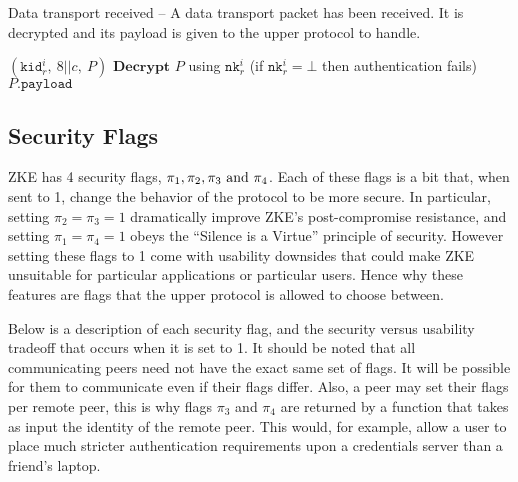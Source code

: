 \documentclass{article}
\begin{document}
\begin{algorithm}
	\caption{Data transport received -- A data transport packet has been received. It is decrypted and its payload is given to the upper protocol to handle.}
	\begin{algorithmic}
		\Require $(\texttt{kid}^i_r,\ 8||c,\ P)$
		\State $\textbf{Decrypt } P$ using $\texttt{nk}^i_r$ (if $\texttt{nk}^i_r=\bot$ then authentication fails)
		\Ensure $P\texttt{.payload}$
	\end{algorithmic}
\end{algorithm}

\subsection{Security Flags}\label{sec:security_flags}

ZKE has 4 security flags, $\pi_1, \pi_2, \pi_3 \text{ and } \pi_4$. Each of these flags is a bit that, when sent to 1, change the behavior of the protocol to be more secure. In particular, setting $\pi_2 = \pi_3 = 1$ dramatically improve ZKE's post-compromise resistance, and setting $\pi_1 = \pi_4 = 1$ obeys the ``Silence is a Virtue'' principle of security. However setting these flags to 1 come with usability downsides that could make ZKE unsuitable for particular applications or particular users. Hence why these features are flags that the upper protocol is allowed to choose between.

Below is a description of each security flag, and the security versus usability tradeoff that occurs when it is set to 1. It should be noted that all communicating peers need not have the exact same set of flags. It will be possible for them to communicate even if their flags differ. Also, a peer may set their flags per remote peer, this is why flags $\pi_3$ and $\pi_4$ are returned by a function that takes as input the identity of the remote peer. This would, for example, allow a user to place much stricter authentication requirements upon a credentials server than a friend's laptop.
\end{document}
